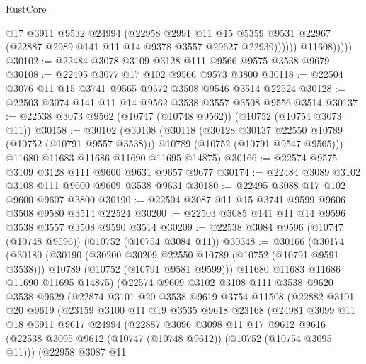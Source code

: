 \begin{lexlean}{RustCore}
\begin{coremodule}
                      @17
                      @3911
                      @9532
                      @24994
                      (@22958
                        @2991
                        @11
                        @15
                        @5359
                        @9531
                        @22967
                        (@22887 @2989 @141 @11 @14 @9378 @3557 @29627 @22939))))))
              @11608)))))
@30102 := @22484 @3078 @3109 @3128 @111 @9566 @9575 @3538 @9679
@30108 := @22495 @3077 @17 @102 @9566 @9573 @3800
@30118 := @22504 @3076 @11 @15 @3741 @9565 @9572 @3508 @9546 @3514 @22524
@30128 := @22503 @3074 @141 @11 @14 @9562 @3538 @3557 @3508 @9556 @3514
@30137 := @22538 @3073 @9562 (@10747 (@10748 @9562)) (@10752 (@10754 @3073 @11))
@30158 := @30102
    (@30108
      (@30118
        (@30128 @30137 @22550 @10789 (@10752 (@10791 @9557 @3538)))
        @10789
        (@10752 (@10791 @9547 @9565)))
      @11680
      @11683
      @11686
      @11690
      @11695
      @14875)
@30166 := @22574 @9575 @3109 @3128 @111 @9600 @9631 @9657 @9677
@30174 := @22484 @3089 @3102 @3108 @111 @9600 @9609 @3538 @9631
@30180 := @22495 @3088 @17 @102 @9600 @9607 @3800
@30190 := @22504 @3087 @11 @15 @3741 @9599 @9606 @3508 @9580 @3514 @22524
@30200 := @22503 @3085 @141 @11 @14 @9596 @3538 @3557 @3508 @9590 @3514
@30209 := @22538 @3084 @9596 (@10747 (@10748 @9596)) (@10752 (@10754 @3084 @11))
@30348 := @30166
    (@30174
      (@30180
        (@30190
          (@30200 @30209 @22550 @10789 (@10752 (@10791 @9591 @3538)))
          @10789
          (@10752 (@10791 @9581 @9599)))
        @11680
        @11683
        @11686
        @11690
        @11695
        @14875)
      (@22574
        @9609
        @3102
        @3108
        @111
        @3538
        @9620
        @3538
        @9629
        (@22874
          @3101
          @20
          @3538
          @9619
          @3754
          @11508
          (@22882
            @3101
            @20
            @9619
            (@23159
              @3100
              @11
              @19
              @3535
              @9618
              @23168
              (@24981
                @3099
                @11
                @18
                @3911
                @9617
                @24994
                (@22887
                  @3096
                  @3098
                  @11
                  @17
                  @9612
                  @9616
                  (@22538 @3095 @9612 (@10747 (@10748 @9612)) (@10752 (@10754 @3095 @11)))
                  (@22958
                    @3087
                    @11

\end{coremodule}
\end{lexlean}
